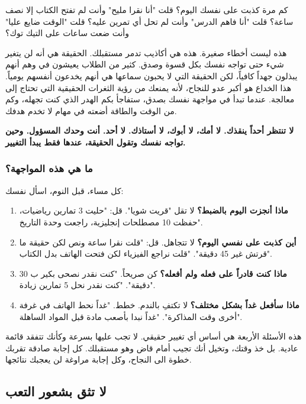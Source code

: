\documentclass[12pt,a4paper]{book}
\newcommand{\importantAr}[1]{%
	\begin{important}
		\bfseries #1
	\end{important}
}
\begin{document}
	كم مرة كذبت على نفسك اليوم؟ قلت "أنا نقرا مليح" وأنت لم تفتح الكتاب إلا نصف ساعة؟ قلت "أنا فاهم الدرس" وأنت لم تحل أي تمرين عليه؟ قلت "الوقت ضايع عليا" وأنت ضعت ساعات على التيك توك؟
	
	هذه ليست أخطاء صغيرة. هذه هي أكاذيب تدمر مستقبلك. الحقيقة هي أنه لن يتغير شيء حتى تواجه نفسك بكل قسوة وصدق. كثير من الطلاب يعيشون في وهم أنهم يبذلون جهداً كافياً، لكن الحقيقة التي لا يحبون سماعها هي أنهم يخدعون أنفسهم يومياً. هذا الخداع هو أكبر عدو للنجاح، لأنه يمنعك من رؤية الثغرات الحقيقية التي تحتاج إلى معالجة. عندما تبدأ في مواجهة نفسك بصدق، ستفاجأ بكم الهدر الذي كنت تجهله، وكم من الوقت والطاقة أضعته في مهام لا تخدم هدفك.
	
	\importantAr{لا تنتظر أحداً ينقذك. لا أمك، لا أبوك، لا أستاذك. لا أحد. أنت وحدك المسؤول. وحين تواجه نفسك وتقول الحقيقة، عندها فقط يبدأ التغيير.}
	
	\subsubsection*{ما هي هذه المواجهة؟}
	
	كل مساء، قبل النوم، اسأل نفسك:
	
	\begin{enumerate}
		\item \textbf{ماذا أنجزت اليوم بالضبط؟} لا تقل "قريت شويا". قل: "حليت 3 تمارين رياضيات، حفظت 10 مصطلحات إنجليزية، راجعت وحدة التاريخ".
		\item \textbf{أين كذبت على نفسي اليوم؟} لا تتجاهل. قل: "قلت نقرا ساعة ونص لكن حقيقة ما قرتش غير 45 دقيقة". "قلت نراجع الفيزياء لكن فتحت الهاتف بدل الكتاب".
		\item \textbf{ماذا كنت قادراً على فعله ولم أفعله؟} كن صريحاً. "كنت نقدر نصحى بكير ب 30 دقيقة". "كنت نقدر نحل 5 تمارين زيادة".
		\item \textbf{ماذا سأفعل غداً بشكل مختلف؟} لا تكتفِ بالندم. خطط. "غداً نحط الهاتف في غرفة أخرى وقت المذاكرة". "غداً نبدا بأصعب مادة قبل المواد الساهلة".
	\end{enumerate}
	
	هذه الأسئلة الأربعة هي أساس أي تغيير حقيقي. لا تجب عليها بسرعة وكأنك تتفقد قائمة عادية. بل خذ وقتك، وتخيل أنك تجيب أمام قاض وهو مستقبلك. كل إجابة صادقة تقربك خطوة الى النجاح، وكل إجابة مراوغة لن يعجبك نتائجها.
	
	\subsection{لا تثق بشعور التعب}
	\label{subsec:40-percent-rule}
	
\end{document}
